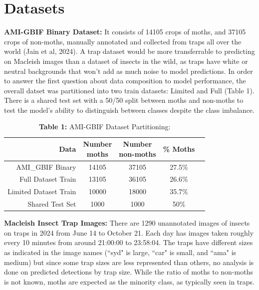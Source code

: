 \documentclass[twocolumn]{article}
\begin{document}
    \section{Datasets}
    \textbf{AMI-GBIF Binary Dataset:} It consists of 14105 crops of moths,
    and 37105 crops of non-moths, manually annotated and
     collected from traps all over the world (Jain et al, 2024).
    A trap dataset would be more transferrable to predicting on Macleish images
     than a dataset of insects in the wild,
    as traps have white or neutral backgrounds that won't add as much noise to model predictions.
    In order to answer the first question about data composition to model performance, the 
    overall datset was
    partitioned into two train datasets: Limited and Full (Table 1).
    There is a shared test set with 
    a 50/50 split between moths and non-moths to test the model's ability to distinguish 
    between
    classes despite the class imbalance. 
    \newline
    \begin{table}[!htb]
        \captionsetup{size=footnotesize}
        \caption*{\textbf{Table 1:} AMI-GBIF Dataset Partitioning:} \label{tab:freq}
        \setlength\tabcolsep{0pt} %
        \footnotesize\centering 
        \begin{tabular*}{\columnwidth}{@{\extracolsep{\fill}}rcccr}\
        Data                  & \thead{Number \\ moths} & \thead{Number \\ non-moths} & \% Moths \\
        \midrule
        AMI\_GBIF Binary    & 14105        & 37105            & 27.5\%   \\
        Full Dataset Train   & 13105        & 36105            & 26.6\%   \\
        Limited Dataset Train & 10000        & 18000            & 35.7\%   \\
        Shared Test Set       & 1000         & 1000             & 50\%    \\
        \midrule
        \end{tabular*}
    \end{table} 
    \newline

    \textbf{Macleish Insect Trap Images:} There are 1290 unannotated images of 
    insects on traps in 2024 from June 14 to October 21. Each day has images taken roughly every 10 minutes from around
    21:00:00 to 23:58:04. The traps have different sizes as indicated in the image 
    names (``syd" is large,
    ``car" is small, and ``ama" is medium) but since some trap sizes are less represented than others,
     no analysis is done on predicted detections by trap size. 
     While the ratio of moths to non-moths is not 
     known, moths are expected as the minority class, as typically seen in traps. 
\end{document}

